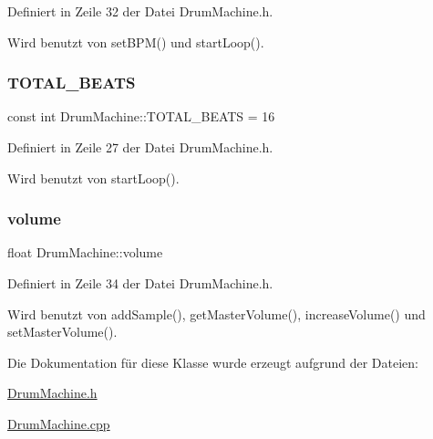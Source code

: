 Definiert in Zeile 32 der Datei Drum\+Machine.\+h.



Wird benutzt von set\+B\+P\+M() und start\+Loop().

\mbox{\label{class_drum_machine_a455f582474a17cbd618940a3d4a4791d}} 
\subsubsection{\texorpdfstring{T\+O\+T\+A\+L\+\_\+\+B\+E\+A\+TS}{TOTAL\_BEATS}}
{\footnotesize\ttfamily const int Drum\+Machine\+::\+T\+O\+T\+A\+L\+\_\+\+B\+E\+A\+TS = 16\hspace{0.3cm}{\ttfamily [private]}}



Definiert in Zeile 27 der Datei Drum\+Machine.\+h.



Wird benutzt von start\+Loop().

\mbox{\label{class_drum_machine_af1401c2a8e1d016ec32c662968e581fd}} 
\subsubsection{\texorpdfstring{volume}{volume}}
{\footnotesize\ttfamily float Drum\+Machine\+::volume\hspace{0.3cm}{\ttfamily [private]}}



Definiert in Zeile 34 der Datei Drum\+Machine.\+h.



Wird benutzt von add\+Sample(), get\+Master\+Volume(), increase\+Volume() und set\+Master\+Volume().



Die Dokumentation für diese Klasse wurde erzeugt aufgrund der Dateien\+:\begin{DoxyCompactItemize}
\item 
\hyperlink{_drum_machine_8h}{Drum\+Machine.\+h}\item 
\hyperlink{_drum_machine_8cpp}{Drum\+Machine.\+cpp}\end{DoxyCompactItemize}
